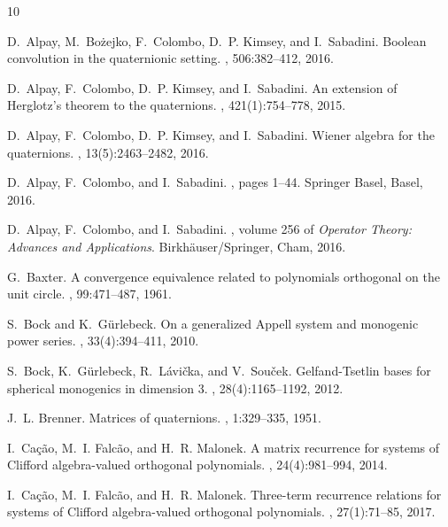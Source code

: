 \documentclass[11pt,reqno]{amsart}
\theoremstyle{definition}
\numberwithin{equation}{section}
\begin{document}
\nocite{Goh86}

\begin{thebibliography}{10}

D.~Alpay, M.~Bożejko, F.~Colombo, D.~P. Kimsey, and I.~Sabadini.
\newblock Boolean convolution in the quaternionic setting.
, 506:382--412, 2016.

D.~Alpay, F.~Colombo, D.~P. Kimsey, and I.~Sabadini.
\newblock An extension of {H}erglotz's theorem to the quaternions.
, 421(1):754--778, 2015.

D.~Alpay, F.~Colombo, D.~P. Kimsey, and I.~Sabadini.
\newblock Wiener algebra for the quaternions.
, 13(5):2463--2482, 2016.

D.~Alpay, F.~Colombo, and I.~Sabadini.
, pages 1--44.
\newblock Springer Basel, Basel, 2016.

D.~Alpay, F.~Colombo, and I.~Sabadini.
, volume 256 of {\em
  Operator Theory: Advances and Applications}.
\newblock Birkh\"{a}user/Springer, Cham, 2016.

G.~Baxter.
\newblock A convergence equivalence related to polynomials orthogonal on the
  unit circle.
, 99:471--487, 1961.

S.~Bock and K.~G\"{u}rlebeck.
\newblock On a generalized {A}ppell system and monogenic power series.
, 33(4):394--411, 2010.

S.~Bock, K.~G\"{u}rlebeck, R.~L\'{a}vi\v{c}ka, and V.~Sou\v{c}ek.
\newblock Gelfand-{T}setlin bases for spherical monogenics in dimension 3.
, 28(4):1165--1192, 2012.

J.~L. Brenner.
\newblock Matrices of quaternions.
, 1:329--335, 1951.

I.~Ca\c{c}\~{a}o, M.~I. Falc\~{a}o, and H.~R. Malonek.
\newblock A matrix recurrence for systems of {C}lifford algebra-valued
  orthogonal polynomials.
, 24(4):981--994, 2014.

I.~Ca\c{c}\~{a}o, M.~I. Falc\~{a}o, and H.~R. Malonek.
\newblock Three-term recurrence relations for systems of {C}lifford
  algebra-valued orthogonal polynomials.
, 27(1):71--85, 2017.


\end{thebibliography}
\end{document}
